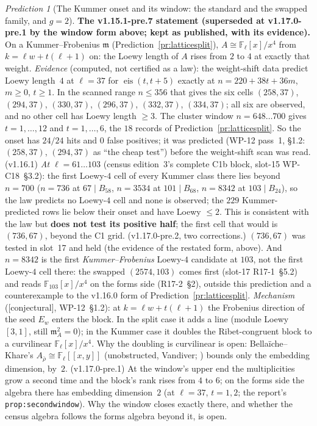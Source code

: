 \documentclass[11pt]{article}
\theoremstyle{remark}
\newtheorem{prediction}[theorem]{Prediction}
\newcommand{\F}{\mathbb{F}}
\newcommand{\Fl}{\F_\ell}
\newcommand{\m}{\mathfrak{m}}
\newcommand{\CONJ}{\textsf{[conjectural]}}
\begin{document}
\begin{prediction}[The Kummer onset and its window: the standard and the swapped family, and $g=2$]
\medskip\noindent\textbf{The v1.15.1-pre.7 statement (superseded at v1.17.0-pre.1 by the window form above; kept as published, with its evidence).}
On a Kummer--Frobenius $\m$ (Prediction~\ref{pr:latticesplit}), $A\cong\Fl[x]/x^4$ from $k=\ell w+t(\ell+1)$ on: the Loewy length of
$A$ rises from $2$ to $4$ at exactly that weight.
\emph{Evidence} (computed, not certified as a law): the weight-shift data predict Loewy length~$4$ at $\ell=37$ for
$\operatorname{eis}(t,t+5)$ exactly at $n=220+38t+36m$, $m\ge0$, $t\ge1$. In the scanned range $n\le356$ that gives the six cells
$(258,37)$, $(294,37)$, $(330,37)$, $(296,37)$, $(332,37)$, $(334,37)$; all six are observed, and no other cell has Loewy length
$\ge3$. The cluster window $n=648\ldots700$ gives $t=1,\dots,12$ and $t=1,\dots,6$, the $18$ records of
Prediction~\ref{pr:latticesplit}. So the onset has $24/24$ hits and $0$ false positives; it was predicted (WP-12 pass~1, \S1.2:
$(258,37)$, $(294,37)$ as ``the cheap test'') before the weight-shift scan was read.
(v1.16.1) \emph{At $\ell=61\ldots103$} (census edition~3's complete C1b block, slot-15 WP-C18~\S3.2): the first Loewy-$4$ cell of
every Kummer class there lies beyond $n=700$ ($n=736$ at $67\mid B_{58}$, $n=3534$ at $101\mid B_{68}$, $n=8342$ at
$103\mid B_{24}$), so the law predicts no Loewy-$4$ cell and none is observed; the $229$ Kummer-predicted rows lie below their
onset and have Loewy $\le2$. This is consistent with the law but \textbf{does not test its positive half}; the first cell that would
is $(736,67)$, beyond the C1 grid. (v1.17.0-pre.2, two corrections.) $(736,67)$ was tested in slot~17 and held (the evidence of the restated form, above).
And $n=8342$ is the first \emph{Kummer--Frobenius} Loewy-$4$ candidate at $103$, not the first Loewy-$4$ cell there: the swapped $(2574,103)$ comes first
(slot-17 R17-1~\S5.2) and reads $\F_{103}[x]/x^4$ on the forms side (R17-2~\S2), outside this prediction and a counterexample to the v1.16.0 form of
Prediction~\ref{pr:latticesplit}.
\emph{Mechanism} (\CONJ, WP-12~\S1.2): at $k=\ell w+t(\ell+1)$ the Frobenius direction of the seed $E_w$ enters the block. In the
split case it adds a line (module Loewy $[3,1]$, still $\m_A^2=0$); in the Kummer case it doubles the Ribet-congruent block to a
curvilinear $\Fl[x]/x^4$. Why the doubling is curvilinear is open: Bella\"iche--Khare's $A_{\bar\rho}\cong\Fl[[x,y]]$
(unobstructed, Vandiver; \cite{bk}) bounds only the embedding dimension, by~$2$. (v1.17.0-pre.1) At the window's upper end the multiplicities grow a
second time and the block's rank rises from $4$ to $6$; on the forms side the algebra there has embedding dimension~$2$ (at $\ell=37$, $t=1,2$; the
report's \texttt{prop:secondwindow}). Why the window closes exactly
there, and whether the census algebra follows the forms algebra beyond it, is open.
\end{prediction}
\end{document}
